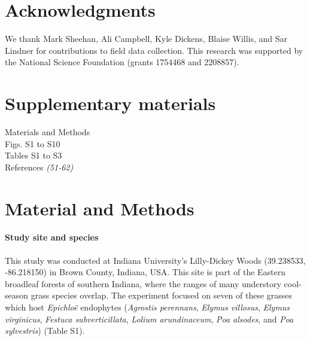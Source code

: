 \documentclass[12pt]{article}
\begin{document}








\section*{Acknowledgments}
We thank Mark Sheehan, Ali Campbell, Kyle Dickens, Blaise Willis, and Sar Lindner for contributions to field data collection. 
This research was supported by the National Science Foundation (grants 1754468 and 2208857). 


\section*{Supplementary materials}
Materials and Methods\\


Figs. S1 to S10\\
Tables S1 to S3\\
References \textit{(51-62)}


\section*{Material and Methods}
\paragraph*{Study site and species}
This study was conducted at Indiana University's Lilly-Dickey Woods (39.238533, -86.218150) in Brown County, Indiana, USA. 
This site is part of the Eastern broadleaf forests of southern Indiana, where the ranges of many understory cool-season grass species overlap. 
The experiment focused on seven of these grasses which host \emph{Epichlo\"e} endophytes (\emph{Agrostis perennans}, \emph{Elymus villosus}, \emph{Elymus virginicus}, \emph{Festuca subverticillata}, \emph{Lolium arundinaceum}, \emph{Poa alsodes}, and \emph{Poa sylvestris}) (Table S1). 
\end{document}

